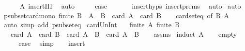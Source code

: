 \begin{isabellebody}
\ \ \ \ \isamarkupfalse%
\ A\ insert{\isachardot}{\kern0pt}IH\ \isamarkupfalse%
\ auto\isanewline
\ \ \isamarkupfalse%
\ \isamarkupfalse%
\ {\isacharquery}{\kern0pt}case\ \isanewline
\ \ \ \ \isamarkupfalse%
\ insert{\isachardot}{\kern0pt}hyps\ insert{\isachardot}{\kern0pt}prems\ \isamarkupfalse%
\ auto\isanewline
{}\isamarkupfalse%
\ auto%
\endisatagproof
{\isafoldproof}%
%
\isadelimproof
\isanewline
%
\endisadelimproof
\isanewline
{}\isamarkupfalse%
\ psubset{\isacharunderscore}{\kern0pt}card{\isacharunderscore}{\kern0pt}mono{\isacharcolon}{\kern0pt}\ {\isachardoublequoteopen}finite\ B\ {\isasymLongrightarrow}\ A\ {\isacharless}{\kern0pt}\ B\ {\isasymLongrightarrow}\ card\ A\ {\isacharless}{\kern0pt}\ card\ B{\isachardoublequoteclose}\isanewline
%
\isadelimproof
\ \ %
\endisadelimproof
%
\isatagproof
{}\isamarkupfalse%
\ card{\isacharunderscore}{\kern0pt}seteq\ {\isacharbrackleft}{\kern0pt}of\ B\ A{\isacharbrackright}{\kern0pt}\ \isamarkupfalse%
\ {\isacharparenleft}{\kern0pt}auto\ simp\ add{\isacharcolon}{\kern0pt}\ psubset{\isacharunderscore}{\kern0pt}eq{\isacharparenright}{\kern0pt}%
\endisatagproof
{\isafoldproof}%
%
\isadelimproof
\isanewline
%
\endisadelimproof
\isanewline
{}\isamarkupfalse%
\ card{\isacharunderscore}{\kern0pt}Un{\isacharunderscore}{\kern0pt}Int{\isacharcolon}{\kern0pt}\isanewline
\ \ \ {\isachardoublequoteopen}finite\ A{\isachardoublequoteclose}\ {\isachardoublequoteopen}finite\ B{\isachardoublequoteclose}\isanewline
\ \ \ {\isachardoublequoteopen}card\ A\ {\isacharplus}{\kern0pt}\ card\ B\ {\isacharequal}{\kern0pt}\ card\ {\isacharparenleft}{\kern0pt}A\ {\isasymunion}\ B{\isacharparenright}{\kern0pt}\ {\isacharplus}{\kern0pt}\ card\ {\isacharparenleft}{\kern0pt}A\ {\isasyminter}\ B{\isacharparenright}{\kern0pt}{\isachardoublequoteclose}\isanewline
%
\isadelimproof
\ \ %
\endisadelimproof
%
\isatagproof
{}\isamarkupfalse%
\ assms\isanewline
{}\isamarkupfalse%
\ {\isacharparenleft}{\kern0pt}induct\ A{\isacharparenright}{\kern0pt}\isanewline
\ \ \isamarkupfalse%
\ empty\isanewline
\ \ \isamarkupfalse%
\ \isamarkupfalse%
\ {\isacharquery}{\kern0pt}case\ \isamarkupfalse%
\ simp\isanewline
{}\isamarkupfalse%
\isanewline
\ \ \isamarkupfalse%
\ insert\isanewline
\ \ \isamarkupfalse%

\end{isabellebody}
